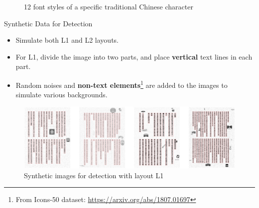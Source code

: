 \documentclass{beamer}
\begin{document}
\begin{frame}
\begin{figure}[htbp]
\begin{subfigure}[b]{0.1\linewidth}
            \label{fig:fonts12}
        \end{subfigure}
        \caption{12 font styles of a specific traditional Chinese character}
        \label{fig:fonts}
    \end{figure}
\end{frame}

\begin{frame}
    \begin{center}
        \Large{Synthetic Data for Detection}
    \end{center}
    \begin{itemize}
        \item Simulate both L1 and L2 layouts.
        \item For L1, divide the image into two parts, and place \textbf{vertical} text lines in each part.
        \item Random noises and \textbf{non-text elements}\footnote{From Icons-50 dataset: \url{https://arxiv.org/abs/1807.01697}} are added to the images to simulate various backgrounds.
    \end{itemize}
    \begin{figure}
        \centering
        \includegraphics[width=\textwidth]{figures/synthetic_det1.jpeg}
        \caption{Synthetic images for detection with layout L1}
    \end{figure}
\end{frame}
\end{document}
